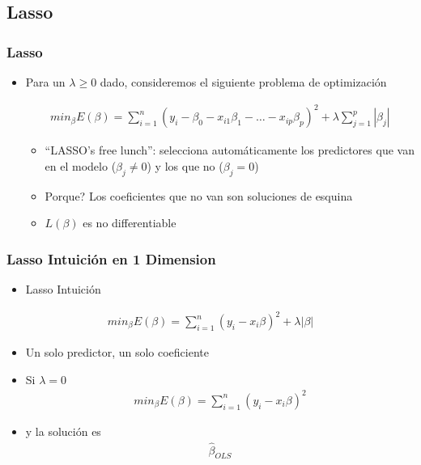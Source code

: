 \documentclass[
  shownotes,
  xcolor={svgnames},
  hyperref={colorlinks,citecolor=DarkBlue,linkcolor=DarkRed,urlcolor=DarkBlue}
  , aspectratio=169]{beamer}
\begin{document}
\subsection{Lasso}
\begin{frame}[fragile]
\frametitle{Lasso}

\begin{itemize}
\item Para un $\lambda \geq 0$ dado, consideremos el siguiente problema de optimización


\begin{align}
min_{\beta} E(\beta) = \sum_{i=1}^n (y_i-\beta_0 - x_{i1}\beta_1 - \dots - x_{ip}\beta_p)^2 + \lambda \sum_{j=1}^p |\beta_j| 
\end{align}

\medskip
\pause
  \begin{itemize}
    \item  ``LASSO's free lunch'': selecciona automáticamente los predictores que van en el modelo ($\beta_j \neq 0$) y los que no   ($\beta_j = 0$)
    \medskip
    \item Porque? Los coeficientes que no van son soluciones de esquina
    \medskip
    \item  $L(\beta)$ es no differentiable
  \end{itemize}
\end{itemize}

\end{frame}
\begin{frame}[fragile]
\frametitle{Lasso Intuición en 1 Dimension}

\begin{itemize}
\item Lasso Intuición
\end{itemize}

\bigskip

\begin{align}
min_{\beta} E(\beta) = \sum_{i=1}^n (y_i-x_i \beta)^2 + \lambda|\beta| 
\end{align}

\begin{itemize}
  \item Un solo predictor, un solo coeficiente
  \medskip
  \item Si $\lambda=0$
\begin{align}
  min_{\beta} E(\beta) = \sum_{i=1}^n (y_i-x_i \beta)^2 
  \end{align}
  \item y la solución es
  \begin{align}
    \hat{\beta}_{OLS}
  \end{align}
  
\end{itemize}

\end{frame}
\end{document}
